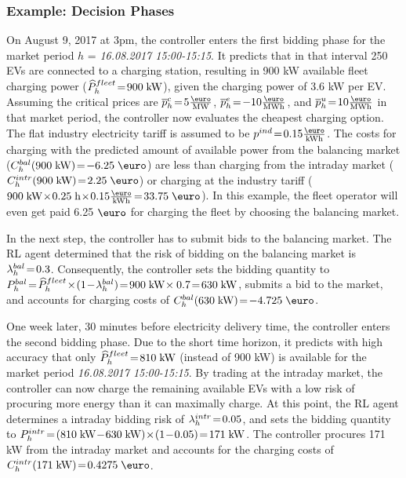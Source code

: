 \documentclass[a4paper, 12pt]{article}
\begin{document}
\subsubsection{Example: Decision Phases}
\label{sec:org1d77ea2}
On August 9, 2017 at 3pm, the controller enters the first bidding phase for the
market period \(h\) = \emph{16.08.2017 15:00-15:15}. It predicts that in that interval
250 EVs are connected to a charging station, resulting in 900 kW available fleet
charging power (\(\widehat{P}^{fleet}_{h}\!=\!900\;\text{kW}\)), given the charging power of 3.6 kW
per EV. Assuming the critical prices are \(\ccp{h}\!=\!5\emw\),
\(\cep{h}\!=\!-10\emwh\), and \(\cup{h}\!=\!10\emwh\) in that market period, the
controller now evaluates the cheapest charging option. The flat industry
electricity tariff is assumed to be \(p^{ind}\!=\!0.15\ekwh\). The costs for
charging with the predicted amount of available power from the balancing market
(\(\Cb{h}(900\;\kw)\!=\!-6.25\;\eur\)) are less than charging from the intraday
market (\(\Ci{h}(900\;\kw)\!=\!2.25\;\eur\)) or charging at the industry tariff
(\(900\;\kw\!\times\!0.25\;\text{h}\!\times\!0.15\ekwh\!=\!33.75\;\eur\)). In this
example, the fleet operator will even get paid 6.25 \(\eur\) for charging the
fleet by choosing the balancing market.

In the next step, the controller has to submit bids to the balancing market. The
RL agent determined that the risk of bidding on the balancing market is
\(\lambda^{bal}_{h}\!=\!0.3\). Consequently, the controller sets the bidding quantity to
\(\Pb{h}\!=\!\fPhat{h}\!\times\!(1\!-\!\lb{h})\!=\!900\;\kw\!\times0.7\!=\!630\;\kw\),
submits a bid to the market, and accounts for charging costs of
\(\Cb{h}(630\;\kw)\!=\!-4.725\;\eur\).

One week later, 30 minutes before electricity delivery time, the controller
enters the second bidding phase. Due to the short time horizon, it predicts with
high accuracy that only \(\widehat{P}^{fleet}_{h}\!=\!810\;\text{kW}\) (instead of 900 kW) is
available for the market period \emph{16.08.2017 15:00-15:15}. By trading at the
intraday market, the controller can now charge the remaining available EVs with
a low risk of procuring more energy than it can maximally charge. At this point,
the RL agent determines a intraday bidding risk of \(\lambda^{intr}_{h}\!=\!0.05\), and sets
the bidding quantity to
\(\Pi{h}\!=\!(810\;\kw\!-\!630\;\kw)\!\times\!(1\!-\!0.05)\!=\!171\;\kw\). The
controller procures 171 kW from the intraday market and accounts for the
charging costs of \(\Ci{h}(171\;\kw)\!=\!0.4275\;\eur\).
\end{document}
